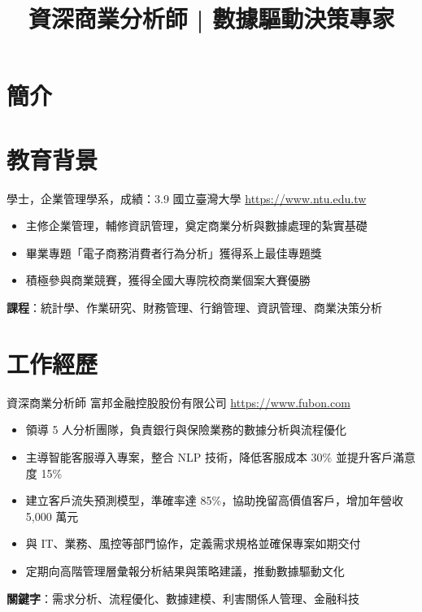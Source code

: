 \documentclass[a4paper, serif, 10pt]{moderncv}
\title{資深商業分析師 | 數據驅動決策專家}
\begin{document}
\maketitle

\section{簡介}

\section{教育背景}

        {學士，企業管理學系，成績：3.9}
        {國立臺灣大學}
        {\url{https://www.ntu.edu.tw}}
        {}
        {\begin{itemize}
\item 主修企業管理，輔修資訊管理，奠定商業分析與數據處理的紮實基礎
\item 畢業專題「電子商務消費者行為分析」獲得系上最佳專題獎
\item 積極參與商業競賽，獲得全國大專院校商業個案大賽優勝
\end{itemize}
\textbf{課程}：統計學、作業研究、財務管理、行銷管理、資訊管理、商業決策分析}
\section{工作經歷}

        {資深商業分析師}
        {富邦金融控股股份有限公司}
        {\url{https://www.fubon.com}}
        {}
        {\begin{itemize}
\item 領導 5 人分析團隊，負責銀行與保險業務的數據分析與流程優化
\item 主導智能客服導入專案，整合 NLP 技術，降低客服成本 30\% 並提升客戶滿意度 15\%
\item 建立客戶流失預測模型，準確率達 85\%，協助挽留高價值客戶，增加年營收 5,000 萬元
\item 與 IT、業務、風控等部門協作，定義需求規格並確保專案如期交付
\item 定期向高階管理層彙報分析結果與策略建議，推動數據驅動文化
\end{itemize}
\textbf{關鍵字}：需求分析、流程優化、數據建模、利害關係人管理、金融科技}
\end{document}
